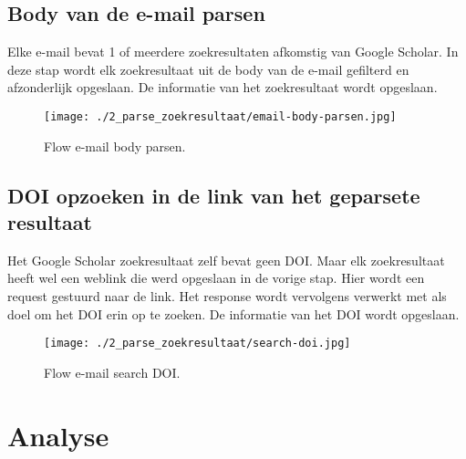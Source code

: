 \subsection{Body van de e-mail parsen}
Elke e-mail bevat 1 of meerdere zoekresultaten afkomstig van Google Scholar. In deze stap wordt elk zoekresultaat uit de body van de e-mail gefilterd en afzonderlijk opgeslaan.
De informatie van het zoekresultaat wordt opgeslaan.
\begin{figure}
    \centering
    \texttt{[image: ./2\_parse\_zoekresultaat/email-body-parsen.jpg]}
    \caption[E-mail body parsen.]{\label{fig:E-mail body parsen}Flow e-mail body parsen.}
\end{figure}
\FloatBarrier
\subsection{DOI opzoeken in de link van het geparsete resultaat}
Het Google Scholar zoekresultaat zelf bevat geen DOI. Maar elk zoekresultaat heeft wel een weblink die werd opgeslaan in de vorige stap. Hier wordt een request gestuurd naar de link. Het response wordt vervolgens verwerkt met als doel om het DOI erin op te zoeken. De informatie van het DOI wordt opgeslaan.
\begin{figure}
    \centering
    \texttt{[image: ./2\_parse\_zoekresultaat/search-doi.jpg]}
    \caption[E-mail search DOI.]{\label{fig:E-mail search DOI}Flow e-mail search DOI.}
\end{figure}
\FloatBarrier
\section{Analyse}
